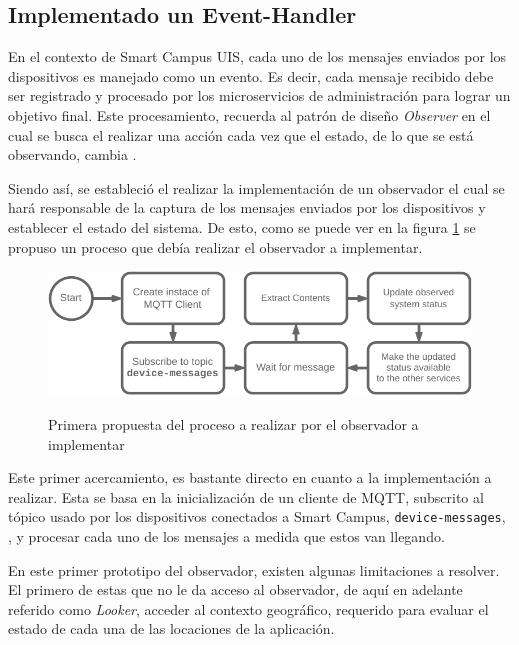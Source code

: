 
\subsection{Implementado un Event-Handler}

En el contexto de Smart Campus UIS, cada uno de los mensajes enviados por los dispositivos es manejado como un evento. Es decir, cada mensaje recibido debe ser registrado y procesado por los microservicios de administración para lograr un objetivo final. Este procesamiento, recuerda al patrón de diseño \textit{Observer} en el cual se busca el realizar una acción cada vez que el estado, de lo que se está observando, cambia \cite{Shvets2019}.

Siendo así, se estableció el realizar la implementación de un observador el cual se hará responsable de la captura de los mensajes enviados por los dispositivos y establecer el estado del sistema. De esto, como se puede ver en la figura \ref{fig:proceso_looker} se propuso un proceso que debía realizar el observador a implementar.

\begin{figure}[ht]
    \caption{Primera propuesta del proceso a realizar \linebreak por el observador a implementar} 
    \centering
    \includegraphics[width=\linewidth]{images/LookerProcess.pdf}
    \label{fig:proceso_looker}
\end{figure} 

Este primer acercamiento, es bastante directo en cuanto a la implementación a realizar. Esta se basa en la inicialización de un cliente de MQTT, subscrito al tópico usado por los dispositivos conectados a Smart Campus, \texttt{device-messages}, \cite{SmartCampusGithub}, y procesar cada uno de los mensajes a medida que estos van llegando. 

En este primer prototipo del observador, existen algunas limitaciones a resolver. El primero de estas que no le da acceso al observador, de aquí en adelante referido como \textit{Looker}, acceder al contexto geográfico, requerido para evaluar el estado de cada una de las locaciones de la aplicación. 

